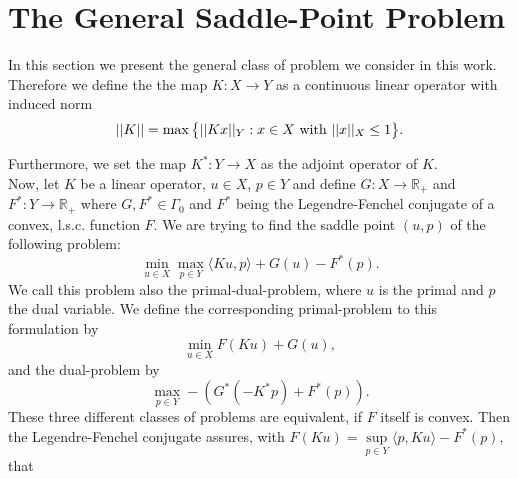 \section{The General Saddle-Point Problem} %
\label{sec:the_general_saddle_point_problem}
    
    In this section we present the general class of problem we consider in this work. Therefore we define the the map $K: X \longrightarrow Y$ as a continuous linear operator with induced norm
        \begin{equation}
            ||K|| = \max \big\{ ||Kx||_{Y} : x \in X \,\, \textnormal{with} \,\, ||x||_{X} \le 1 \big\}.
            \label{eq:operator_norm}
        \end{equation}

    Furthermore, we set the map $K^{\ast}: Y \longrightarrow X$ as the adjoint operator of $K$.\\
    Now, let $K$ be a linear operator, $u \in X$, $p \in Y$ and define $G: X \longrightarrow \mathbb{R}_{+}$ and $F^{\ast}: Y \longrightarrow \mathbb{R}_{+}$ where $G, F^{\ast} \in \Gamma_{0}$ and $F^{\ast}$ being the Legendre-Fenchel conjugate of a convex, l.s.c. function $F$. We are trying to find the saddle point $(u, p)$ of the following problem:
        \begin{equation}
            \min_{u \in X} \max_{p \in Y} \langle Ku, p \rangle + G(u) - F^{\ast}(p).
            \label{eq:the_saddle_point_problem}
        \end{equation}
    We call this problem also the primal-dual-problem, where $u$ is the primal and $p$ the dual variable. We define the corresponding primal-problem to this formulation by
        \begin{equation}
            \min_{u \in X} F(Ku) + G(u),
            \label{eq:primal_problem}
        \end{equation}
    and the dual-problem by
        \begin{equation}
            \max_{p \in Y} -(G^{\ast}(-K^{\ast}p) + F^{\ast}(p)).
            \label{eq:dual_problem}
        \end{equation}
    These three different classes of problems are equivalent, if $F$ itself is convex. Then the Legendre-Fenchel conjugate assures, with $F(Ku) = \sup\limits_{p \in Y} \langle p, Ku \rangle - F^{\ast}(p)$, that
